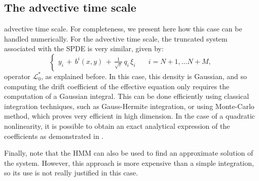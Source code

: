 \subsection{The advective time scale}
\label{sec:the_advective_time_scale}
advective time scale. For completeness, we present here how this case can be
handled numerically. For the advective time scale, the truncated system
associated with the SPDE is very similar, given by:
\begin{equation}
    \left\{\begin{aligned} 
            y_{i}\,+\,b^{i}(x,y)\,+\,\frac 1{\sqrt {\varepsilon}}\,q_{i}\,{\xi}_{i} &
            \quad i = N+1, {\dots}N+M,
        \end{aligned} \right. 
\end{equation}
operator $\mathcal L_0^*$, as explained before. In this case, this density is
Gaussian, and so computing the drift coefficient of the effective equation only
requires the computation of a Gaussian integral. This can be done efficiently
using classical integration techniques, such as Gauss-Hermite integration, or
using Monte-Carlo method, which proves very efficient in high dimension. In the case of 
a quadratic nonlinearity, it is possible to obtain an exact analytical
expression of the coefficients as demonstrated in \cite{abdulle2012numerical}.

Finally, note that the HMM can also be used to find an approximate solution of
the system. However, this approach is more expensive than a simple integration, so its 
use is not really justified in this case. 
